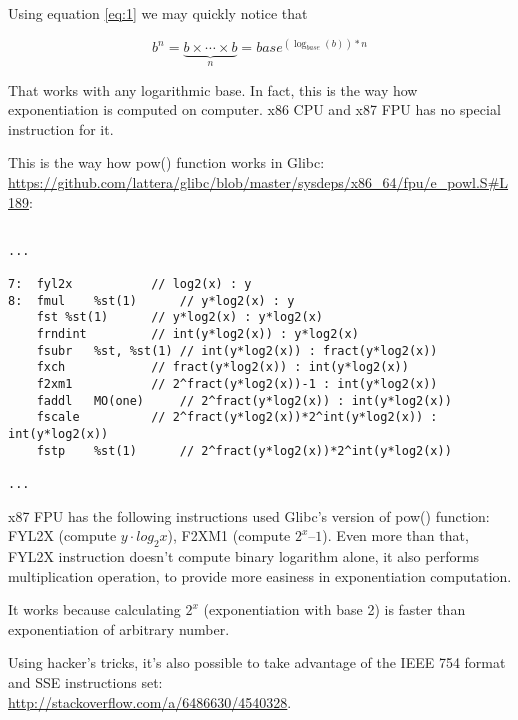 
Using equation \ref{eq:1} we may quickly notice that

\begin{equation}
b^n = \underbrace{b \times \cdots \times b}_n = base^{(\log_{base} (b))*n}
\end{equation}

That works with any logarithmic base.
In fact, this is the way how exponentiation is computed on computer.
x86 CPU and x87 FPU has no special instruction for it.

This is the way how pow() function works in Glibc: \url{https://github.com/lattera/glibc/blob/master/sysdeps/x86_64/fpu/e_powl.S\#L189}:\\

\begin{lstlisting}[caption={Glibc source code, fragment of the pow() function}]

...

7:	fyl2x			// log2(x) : y
8:	fmul	%st(1)		// y*log2(x) : y
	fst	%st(1)		// y*log2(x) : y*log2(x)
	frndint			// int(y*log2(x)) : y*log2(x)
	fsubr	%st, %st(1)	// int(y*log2(x)) : fract(y*log2(x))
	fxch			// fract(y*log2(x)) : int(y*log2(x))
	f2xm1			// 2^fract(y*log2(x))-1 : int(y*log2(x))
	faddl	MO(one)		// 2^fract(y*log2(x)) : int(y*log2(x))
	fscale			// 2^fract(y*log2(x))*2^int(y*log2(x)) : int(y*log2(x))
	fstp	%st(1)		// 2^fract(y*log2(x))*2^int(y*log2(x))

...

\end{lstlisting}

x87 FPU has the following instructions used Glibc's version of pow() function:
FYL2X (compute $y \cdot log_2 x$), F2XM1 (compute $2^x–1$).
Even more than that, FYL2X instruction doesn't compute binary logarithm alone, it also performs multiplication operation, 
to provide more easiness in exponentiation computation.

It works because calculating $2^x$ (exponentiation with base 2) is faster than exponentiation of arbitrary number.

Using hacker's tricks, it's also possible to take advantage of the IEEE 754 format and SSE instructions set:\\
\url{http://stackoverflow.com/a/6486630/4540328}.

